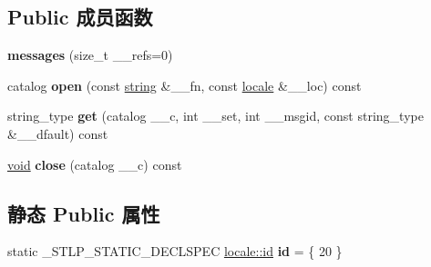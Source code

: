\subsection*{Public 成员函数}
\begin{DoxyCompactItemize}
\item 
\mbox{\label{classmessages_3_01wchar__t_01_4_a4478db1431ac9d30bb8410e60c5e955f}} 
{\bfseries messages} (size\+\_\+t \+\_\+\+\_\+refs=0)
\item 
\mbox{\label{classmessages_3_01wchar__t_01_4_a05ef2495300e1137c1c71ca127f1a2dc}} 
catalog {\bfseries open} (const \hyperlink{structstring}{string} \&\+\_\+\+\_\+fn, const \hyperlink{classlocale}{locale} \&\+\_\+\+\_\+loc) const
\item 
\mbox{\label{classmessages_3_01wchar__t_01_4_a7ba3ad8e16f85efcd4c27952536b2ba1}} 
string\+\_\+type {\bfseries get} (catalog \+\_\+\+\_\+c, int \+\_\+\+\_\+set, int \+\_\+\+\_\+msgid, const string\+\_\+type \&\+\_\+\+\_\+dfault) const
\item 
\mbox{\label{classmessages_3_01wchar__t_01_4_a55a46ddadf2d0bcbc5eb493c0a2ce615}} 
\hyperlink{interfacevoid}{void} {\bfseries close} (catalog \+\_\+\+\_\+c) const
\end{DoxyCompactItemize}
\subsection*{静态 Public 属性}
\begin{DoxyCompactItemize}
\item 
\mbox{\label{classmessages_3_01wchar__t_01_4_ae98b88090527ebd7acf990e433f8cb27}} 
static \+\_\+\+S\+T\+L\+P\+\_\+\+S\+T\+A\+T\+I\+C\+\_\+\+D\+E\+C\+L\+S\+P\+EC \hyperlink{classlocale_1_1id}{locale\+::id} {\bfseries id} = \{ 20 \}
\end{DoxyCompactItemize}
